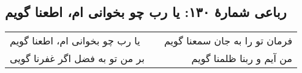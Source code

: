 \begin{center}
\section*{رباعی شمارهٔ ۱۳۰: یا رب چو بخوانی ام، اطعنا گویم}
\label{sec:130}
\begin{longtable}{l p{0.5cm} r}
یا رب چو بخوانی ام، اطعنا گویم
&&
فرمان تو را  به جان سمعنا گویم
\\
بر من تو به فضل اگر غفرنا گویی
&&
من آیم و ربنا ظلمنا گویم
\\
\end{longtable}
\end{center}

